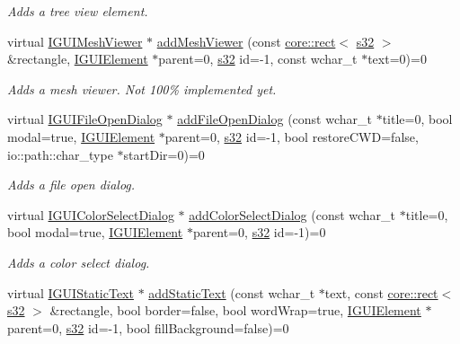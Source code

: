 \begin{DoxyCompactItemize}
\begin{DoxyCompactList}\small\item\em Adds a tree view element. \end{DoxyCompactList}\item 
virtual \hyperlink{classirr_1_1gui_1_1IGUIMeshViewer}{I\+G\+U\+I\+Mesh\+Viewer} $\ast$ \hyperlink{classirr_1_1gui_1_1IGUIEnvironment_a4e35088a4346e5a80d1362e406a628e2}{add\+Mesh\+Viewer} (const \hyperlink{classirr_1_1core_1_1rect}{core\+::rect}$<$ \hyperlink{namespaceirr_ac66849b7a6ed16e30ebede579f9b47c6}{s32} $>$ \&rectangle, \hyperlink{classirr_1_1gui_1_1IGUIElement}{I\+G\+U\+I\+Element} $\ast$parent=0, \hyperlink{namespaceirr_ac66849b7a6ed16e30ebede579f9b47c6}{s32} id=-\/1, const wchar\+\_\+t $\ast$text=0)=0
\begin{DoxyCompactList}\small\item\em Adds a mesh viewer. Not 100\% implemented yet. \end{DoxyCompactList}\item 
virtual \hyperlink{classirr_1_1gui_1_1IGUIFileOpenDialog}{I\+G\+U\+I\+File\+Open\+Dialog} $\ast$ \hyperlink{classirr_1_1gui_1_1IGUIEnvironment_aaac7c786a19c5cac51a550ce77cd972a}{add\+File\+Open\+Dialog} (const wchar\+\_\+t $\ast$title=0, bool modal=true, \hyperlink{classirr_1_1gui_1_1IGUIElement}{I\+G\+U\+I\+Element} $\ast$parent=0, \hyperlink{namespaceirr_ac66849b7a6ed16e30ebede579f9b47c6}{s32} id=-\/1, bool restore\+C\+WD=false, io\+::path\+::char\+\_\+type $\ast$start\+Dir=0)=0
\begin{DoxyCompactList}\small\item\em Adds a file open dialog. \end{DoxyCompactList}\item 
virtual \hyperlink{classirr_1_1gui_1_1IGUIColorSelectDialog}{I\+G\+U\+I\+Color\+Select\+Dialog} $\ast$ \hyperlink{classirr_1_1gui_1_1IGUIEnvironment_a72858e14c66a1ee4687e6f51dedb0ce0}{add\+Color\+Select\+Dialog} (const wchar\+\_\+t $\ast$title=0, bool modal=true, \hyperlink{classirr_1_1gui_1_1IGUIElement}{I\+G\+U\+I\+Element} $\ast$parent=0, \hyperlink{namespaceirr_ac66849b7a6ed16e30ebede579f9b47c6}{s32} id=-\/1)=0
\begin{DoxyCompactList}\small\item\em Adds a color select dialog. \end{DoxyCompactList}\item 
virtual \hyperlink{classirr_1_1gui_1_1IGUIStaticText}{I\+G\+U\+I\+Static\+Text} $\ast$ \hyperlink{classirr_1_1gui_1_1IGUIEnvironment_adb56652b23932a391b08f710a9546ef3}{add\+Static\+Text} (const wchar\+\_\+t $\ast$text, const \hyperlink{classirr_1_1core_1_1rect}{core\+::rect}$<$ \hyperlink{namespaceirr_ac66849b7a6ed16e30ebede579f9b47c6}{s32} $>$ \&rectangle, bool border=false, bool word\+Wrap=true, \hyperlink{classirr_1_1gui_1_1IGUIElement}{I\+G\+U\+I\+Element} $\ast$parent=0, \hyperlink{namespaceirr_ac66849b7a6ed16e30ebede579f9b47c6}{s32} id=-\/1, bool fill\+Background=false)=0

\end{DoxyCompactItemize}
